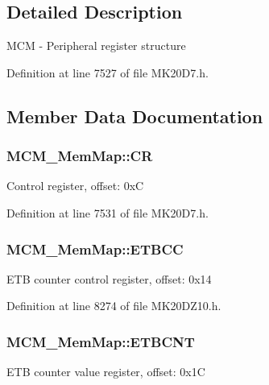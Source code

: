 \subsection{Detailed Description}
M\+CM -\/ Peripheral register structure 

Definition at line 7527 of file M\+K20\+D7.\+h.



\subsection{Member Data Documentation}
\subsubsection[{\texorpdfstring{CR}{CR}}]{ M\+C\+M\+\_\+\+Mem\+Map\+::\+CR}\hypertarget{struct_m_c_m___mem_map_a7bc89132595b7fb75318b4ba285957cd}{}\label{struct_m_c_m___mem_map_a7bc89132595b7fb75318b4ba285957cd}
Control register, offset\+: 0xC 

Definition at line 7531 of file M\+K20\+D7.\+h.

\subsubsection[{\texorpdfstring{E\+T\+B\+CC}{ETBCC}}]{ M\+C\+M\+\_\+\+Mem\+Map\+::\+E\+T\+B\+CC}\hypertarget{struct_m_c_m___mem_map_a2d99ca168bd0840c724da29daca2c355}{}\label{struct_m_c_m___mem_map_a2d99ca168bd0840c724da29daca2c355}
E\+TB counter control register, offset\+: 0x14 

Definition at line 8274 of file M\+K20\+D\+Z10.\+h.

\subsubsection[{\texorpdfstring{E\+T\+B\+C\+NT}{ETBCNT}}]{ M\+C\+M\+\_\+\+Mem\+Map\+::\+E\+T\+B\+C\+NT}\hypertarget{struct_m_c_m___mem_map_adfc2ce9910687ae02d33cb7a1584a919}{}\label{struct_m_c_m___mem_map_adfc2ce9910687ae02d33cb7a1584a919}
E\+TB counter value register, offset\+: 0x1C 

